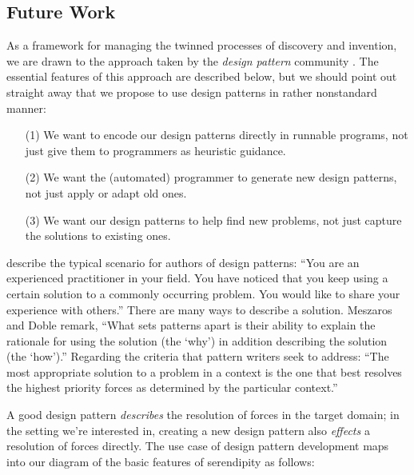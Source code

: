 \subsection{Future Work} \label{sec:futurework} \label{sec:hatching}

As a framework for managing the twinned processes of discovery and
invention, we are drawn to the approach taken by the \emph{design
  pattern} community \cite{alexander1999origins}.  The essential
features of this approach are described below, but we should point out
straight away that we propose to use design patterns in rather
nonstandard manner:
\begin{itemize}
\item[(1)] We want to encode our design patterns directly in runnable
  programs, not just give them to programmers as heuristic guidance.
\item[(2)] We want the (automated) programmer to generate new design
  patterns, not just apply or adapt old ones.
\item[(3)] We want our design patterns to help find new problems,
  not just capture the solutions to existing ones.
\end{itemize}

 describe the typical scenario for authors of design
patterns: ``You are an experienced practitioner in your
field. You have noticed that you keep using a certain solution to a
commonly occurring problem. You would like to share your experience
with others.''  There are many ways to describe a solution.
Meszaros and Doble remark, ``What sets patterns apart is their
ability to explain the rationale for using the solution (the `why') in
addition describing the solution (the `how').''  Regarding the
criteria that pattern writers seek to address: ``The most appropriate
solution to a problem in a context is the one that best resolves the
highest priority forces as determined by the particular context.'' 


A good design pattern \emph{describes} the resolution of forces in the
target domain; in the setting we're interested in, creating a new
design pattern also \emph{effects} a resolution of forces directly.
The use case of design pattern development maps into our diagram of
the basic features of serendipity as follows:



